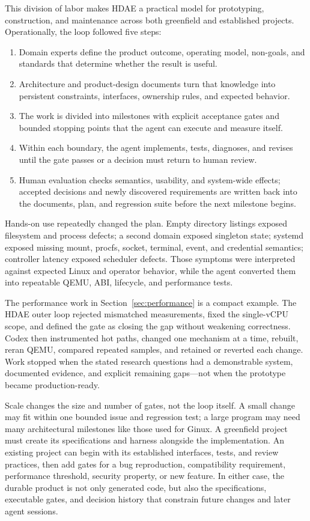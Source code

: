 \documentclass[11pt]{article}
\begin{document}
This division of labor makes HDAE a practical model for prototyping,
construction, and maintenance across both greenfield and established projects.
Operationally, the loop followed five steps:

\begin{enumerate}[leftmargin=*,label=\arabic*.,topsep=0.4em,itemsep=0.25em,parsep=0pt]
\item Domain experts define the product outcome, operating model, non-goals,
  and standards that determine whether the result is useful.
\item Architecture and product-design documents turn that knowledge into
  persistent constraints, interfaces, ownership rules, and expected behavior.
\item The work is divided into milestones with explicit acceptance gates and
  bounded stopping points that the agent can execute and measure itself.
\item Within each boundary, the agent implements, tests, diagnoses, and revises
  until the gate passes or a decision must return to human review.
\item Human evaluation checks semantics, usability, and system-wide effects;
  accepted decisions and newly discovered requirements are written back into
  the documents, plan, and regression suite before the next milestone begins.
\end{enumerate}

Hands-on use repeatedly changed the plan. Empty directory listings exposed
filesystem and process defects; a second domain exposed singleton state;
systemd exposed missing mount, procfs, socket, terminal, event, and credential
semantics; controller latency exposed scheduler defects. Those symptoms were
interpreted against expected Linux and operator behavior, while the agent
converted them into repeatable QEMU, ABI, lifecycle, and performance tests.

The performance work in Section~\ref{sec:performance} is a compact example.
The HDAE outer loop rejected mismatched measurements, fixed the single-vCPU scope,
and defined the gate as closing the gap without weakening correctness. Codex
then instrumented hot paths, changed one mechanism at a time, rebuilt, reran
QEMU, compared repeated samples, and retained or reverted each change. Work
stopped when the stated research questions had a demonstrable system,
documented evidence, and explicit remaining gaps---not when the prototype
became production-ready.

Scale changes the size and number of gates, not the loop itself. A small change
may fit within one bounded issue and regression test; a large program may need
many architectural milestones like those used for Ginux. A greenfield project
must create its specifications and harness alongside the implementation. An
existing project can begin with its established interfaces, tests, and review
practices, then add gates for a bug reproduction, compatibility requirement,
performance threshold, security property, or new feature. In either case, the
durable product is not only generated code, but also the specifications,
executable gates, and decision history that constrain future changes and later
agent sessions.
\end{document}
